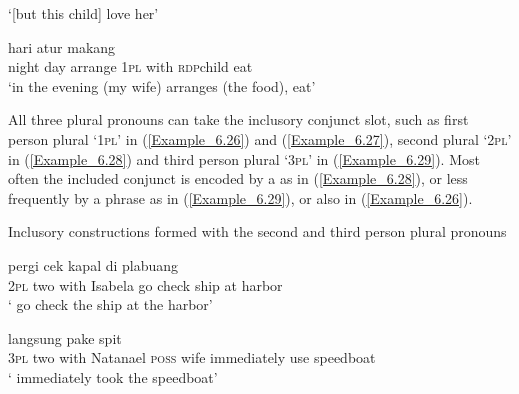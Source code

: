 \glt
‘[but this child] \bluebold{)} love her’ \textstyleExampleSource{[081115-001a-Cv.0251]}
\z

\ea
\label{Example_6.27}
 {hari} {atur} {} {} {} {makang}\\ %
 night  day  arrange  \textsc{1pl}  with  \textsc{rdp}{\Tilde}child  eat\\

\glt
‘in the evening (my wife) arranges (the food),  eat’ \textstyleExampleSource{[080919-004-NP.0007]}
\z


All three plural pronouns can take the inclusory conjunct slot, such as first person plural  ‘\textsc{1pl}’ in (\ref{Example_6.26}) and (\ref{Example_6.27}), second plural  ‘\textsc{2pl}’ in (\ref{Example_6.28}) and third person plural  ‘\textsc{3pl}’ in (\ref{Example_6.29}). Most often the included conjunct is encoded by a  as in (\ref{Example_6.28}), or less frequently by a  phrase as in (\ref{Example_6.29}), or also in (\ref{Example_6.26}).



\begin{styleExampleTitle}
Inclusory  constructions formed with the second and third person plural pronouns
\end{styleExampleTitle}

\ea
\label{Example_6.28}
 {} {} {} {pergi} {cek} {kapal} {di} {plabuang}\\ %
 \textsc{2pl}  two  with  Isabela  go  check  ship  at  harbor\\

\glt
‘ go check the ship at the harbor’ \textstyleExampleSource{[080922-001a-CvPh.0035]}
\z

\ea
\label{Example_6.29}
 {} {} {} {} {} {langsung}  pake  {spit}\\ %
 {\textsc{3pl}}  two  with  Natanael  \textsc{poss}  wife  immediately  use  {speedboat}\\
\glt
‘ immediately took the speedboat’ \textstyleExampleSource{[081014-008-CvNP.0006]}
\z



